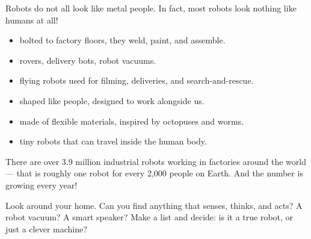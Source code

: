 Robots do not all look like metal people. In fact, most robots look nothing
like humans at all!

\begin{itemize}
  \item \textbf{} \textemdash{} bolted to factory floors, they weld, paint, and assemble.
  \item \textbf{} \textemdash{} rovers, delivery bots, robot vacuums.
  \item \textbf{} \textemdash{} flying robots used for filming, deliveries, and search-and-rescue.
  \item \textbf{} \textemdash{} shaped like people, designed to work alongside us.
  \item \textbf{} \textemdash{} made of flexible materials, inspired by octopuses and worms.
  \item \textbf{} \textemdash{} tiny robots that can travel inside the human body.
\end{itemize}


\begin{funfact}
  There are over 3.9 million industrial robots working in factories
  around the world --- that is roughly one robot for every 2,000 people
  on Earth. And the number is growing every year!
\end{funfact}

\sectionrule

\begin{tryit}
  Look around your home. Can you find anything that senses, thinks, and acts?
  A robot vacuum? A smart speaker? Make a list and decide: is it a true
  robot, or just a clever machine?
\end{tryit}

\sectionrule

